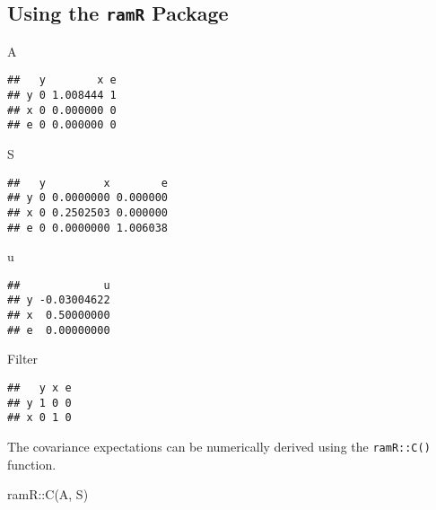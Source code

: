 \documentclass[
]{book}
\newenvironment{Shaded}{\begin{snugshade}}{\end{snugshade}}
\newcommand{\FunctionTok}[1]{\textcolor[rgb]{0.00,0.00,0.00}{#1}}
\newcommand{\NormalTok}[1]{#1}
\newcommand{\SpecialCharTok}[1]{\textcolor[rgb]{0.00,0.00,0.00}{#1}}
\theoremstyle{definition}
\theoremstyle{definition}
\theoremstyle{definition}
\theoremstyle{remark}
\begin{document}
\hypertarget{using-the-ramr-package-1}{%
\subsection{\texorpdfstring{Using the \texttt{ramR} Package}{Using the ramR Package}}\label{using-the-ramr-package-1}}

\begin{Shaded}
\begin{Highlighting}[]
\NormalTok{A}
\end{Highlighting}
\end{Shaded}

\begin{verbatim}
##   y        x e
## y 0 1.008444 1
## x 0 0.000000 0
## e 0 0.000000 0
\end{verbatim}

\begin{Shaded}
\begin{Highlighting}[]
\NormalTok{S}
\end{Highlighting}
\end{Shaded}

\begin{verbatim}
##   y         x        e
## y 0 0.0000000 0.000000
## x 0 0.2502503 0.000000
## e 0 0.0000000 1.006038
\end{verbatim}

\begin{Shaded}
\begin{Highlighting}[]
\NormalTok{u}
\end{Highlighting}
\end{Shaded}

\begin{verbatim}
##             u
## y -0.03004622
## x  0.50000000
## e  0.00000000
\end{verbatim}

\begin{Shaded}
\begin{Highlighting}[]
\NormalTok{Filter}
\end{Highlighting}
\end{Shaded}

\begin{verbatim}
##   y x e
## y 1 0 0
## x 0 1 0
\end{verbatim}

The covariance expectations
can be numerically derived using the \texttt{ramR::C()} function.

\begin{Shaded}
\begin{Highlighting}[]
\NormalTok{ramR}\SpecialCharTok{::}\FunctionTok{C}\NormalTok{(A, S)}
\end{Highlighting}
\end{Shaded}
\end{document}
